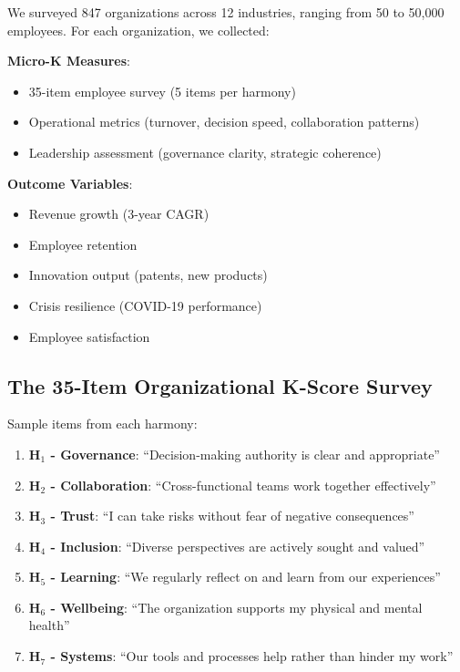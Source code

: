 \documentclass[12pt,a4paper]{article}
\begin{document}
We surveyed 847 organizations across 12 industries, ranging from 50 to 50,000 employees. For each organization, we collected:

\textbf{Micro-K Measures}:
\begin{itemize}
    \item 35-item employee survey (5 items per harmony)
    \item Operational metrics (turnover, decision speed, collaboration patterns)
    \item Leadership assessment (governance clarity, strategic coherence)
\end{itemize}

\textbf{Outcome Variables}:
\begin{itemize}
    \item Revenue growth (3-year CAGR)
    \item Employee retention
    \item Innovation output (patents, new products)
    \item Crisis resilience (COVID-19 performance)
    \item Employee satisfaction
\end{itemize}

\subsection{The 35-Item Organizational K-Score Survey}

Sample items from each harmony:

\begin{enumerate}
    \item \textbf{H$_1$ - Governance}: ``Decision-making authority is clear and appropriate''
    \item \textbf{H$_2$ - Collaboration}: ``Cross-functional teams work together effectively''
    \item \textbf{H$_3$ - Trust}: ``I can take risks without fear of negative consequences''
    \item \textbf{H$_4$ - Inclusion}: ``Diverse perspectives are actively sought and valued''
    \item \textbf{H$_5$ - Learning}: ``We regularly reflect on and learn from our experiences''
    \item \textbf{H$_6$ - Wellbeing}: ``The organization supports my physical and mental health''
    \item \textbf{H$_7$ - Systems}: ``Our tools and processes help rather than hinder my work''
\end{enumerate}
\end{document}
